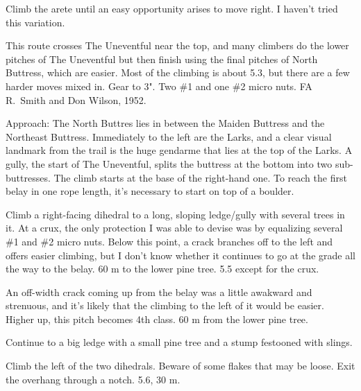 \documentclass{tahquitz}
\begin{document}
 Climb the arete until an easy opportunity arises to move right.
I haven't tried this variation.


\somespace

\upfriction





This route crosses The Uneventful near the top, and many climbers do the lower
pitches of The Uneventful but then finish using the final pitches of
North Buttress, which are easier. Most of the climbing is about 5.3,
but there are a few harder moves mixed in. Gear to 3". Two \#1 and one \#2 micro nuts.
FA R.~Smith and Don Wilson, 1952.

Approach: The North Buttres lies
in between the Maiden Buttress and the Northeast Buttress. Immediately
to the left are the Larks, and a clear visual landmark from the trail
is the huge gendarme that lies at the top of the Larks. A gully, the start
of The Uneventful, splits the buttress at the bottom into two sub-buttresses.
The climb starts at the base of the right-hand one.
To reach the first belay in one rope length, it's necessary to start on top of a boulder.

\somespace

 Climb a right-facing dihedral to a long, sloping ledge/gully with
several trees in it. At a crux, the only protection I was able to devise was by
equalizing several \#1 and \#2 micro nuts. Below this point, a crack branches off
to the left and offers easier climbing, but I don't know whether it continues
to go at the grade all the way to the belay. 60 m to the lower pine tree. 5.5 except for
the crux.

 An off-width crack coming up from the belay was a little awakward and strenuous, and
it's likely that the climbing to the left of it would be easier. Higher up, this pitch
becomes 4th class. 60 m from the lower pine tree.

 Continue to a big ledge with a small pine tree and a stump festooned with
slings.

 Climb the left of the two dihedrals. Beware of some flakes that may be loose.
Exit the overhang through a notch. 5.6, 30 m.
\end{document}
